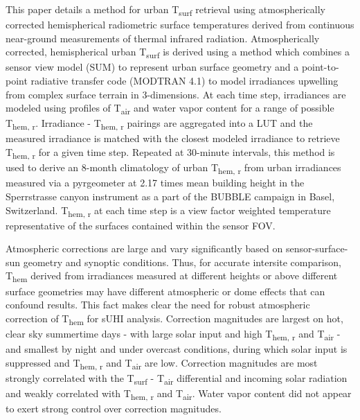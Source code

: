 \begin{bibunit}
This paper details a method for urban T\textsubscript{surf} retrieval using atmospherically corrected hemispherical radiometric surface temperatures derived from continuous near-ground measurements of thermal infrared radiation. Atmospherically corrected, hemispherical urban T\textsubscript{surf} is derived using a method which combines a sensor view model (SUM) to represent urban surface geometry and a point-to-point radiative transfer code (MODTRAN 4.1) to model irradiances upwelling from complex surface terrain in 3-dimensions. At each time step, irradiances are modeled using profiles of T\textsubscript{air} and water vapor content for a range of possible T\textsubscript{hem, r}. Irradiance - T\textsubscript{hem, r} pairings are aggregated into a LUT and the measured irradiance is matched with the closest modeled irradiance to retrieve T\textsubscript{hem, r} for a given time step. Repeated at 30-minute intervals, this method is used to derive an 8-month climatology of urban T\textsubscript{hem, r} from urban irradiances measured via a pyrgeometer at 2.17 times mean building height in the Sperrstrasse canyon instrument as a part of the BUBBLE campaign in Basel, Switzerland. T\textsubscript{hem, r} at each time step is a view factor weighted temperature representative of the surfaces contained within the sensor FOV.
 
Atmospheric corrections are large and vary significantly based on sensor-surface-sun geometry and synoptic conditions. Thus, for accurate intersite comparison, T\textsubscript{hem} derived from irradiances measured at different heights or above different surface geometries may have different atmospheric or dome effects that can confound results. This fact makes clear the need for robust atmospheric correction of T\textsubscript{hem} for sUHI analysis. Correction magnitudes are largest on hot, clear sky summertime days - with large solar input and high T\textsubscript{hem, r} and T\textsubscript{air} - and smallest by night and under overcast conditions, during which solar input is suppressed and T\textsubscript{hem, r} and T\textsubscript{air} are low. Correction magnitudes are most strongly correlated with the T\textsubscript{surf} - T\textsubscript{air} differential and incoming solar radiation and weakly correlated with T\textsubscript{hem, r} and T\textsubscript{air}. Water vapor content did not appear to exert strong control over correction magnitudes.


\end{bibunit}
